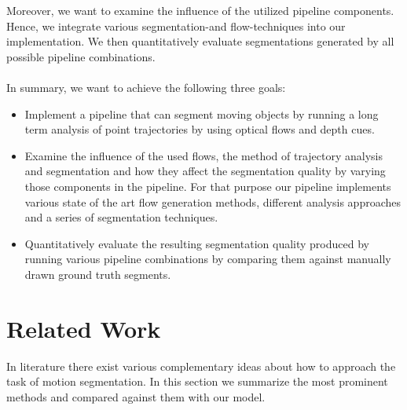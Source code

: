 Moreover, we want to examine the influence of the utilized pipeline components. Hence, we integrate various segmentation-and flow-techniques into our implementation. We then quantitatively evaluate segmentations generated by all possible pipeline combinations. \\ \\
In summary, we want to achieve the following three goals:
\begin{itemize}
  \item Implement a pipeline that can segment moving objects by running a long term analysis of point trajectories by using optical flows and depth cues.
  \item Examine the influence of the used flows, the method of trajectory analysis and segmentation and how they affect the segmentation quality by varying those components in the pipeline. For that purpose our pipeline implements various state of the art flow generation methods, different analysis approaches and a series of segmentation techniques.
  \item Quantitatively evaluate the resulting segmentation quality produced by running various pipeline combinations by comparing them against manually drawn ground truth segments.
\end{itemize}

\section{Related Work}
In literature there exist various complementary ideas about how to approach the task of motion segmentation. In this section we summarize the most prominent methods  and compared against them with our model.
%
%
%
%

